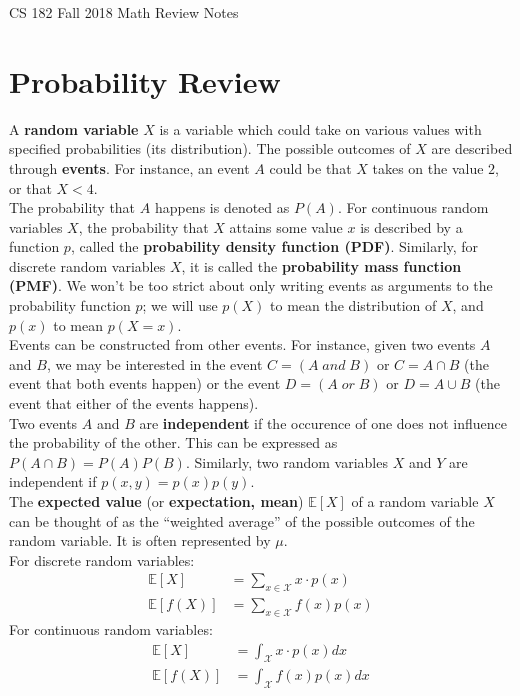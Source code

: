 \documentclass[12pt,letterpaper]{article}
\newcommand{\E}{\mathbb{E}}
\begin{document}
\begin{center}
\LARGE{CS 182 Fall 2018 Math Review Notes}
\end{center}

\section{Probability Review}

A {\bf{random variable}} $X$ is a variable which could take on various values with specified probabilities (its distribution). The possible outcomes of $X$ are described through {\bf{events}}. For instance, an event $A$ could be that $X$ takes on the value $2$, or that $X < 4$. \\

\noindent The probability that $A$ happens is denoted as $P(A)$. For continuous random variables $X$, the probability that $X$ attains some value $x$ is described by a function $p$, called the {\bf{probability density function (PDF)}}. Similarly, for discrete random variables $X$, it is called the {\bf{probability mass function (PMF)}}. We won't be too strict about only writing events as arguments to the probability function $p$; we will use $p(X)$ to mean the distribution of $X$, and $p(x)$ to mean $p(X = x)$. \\

\noindent Events can be constructed from other events. For instance, given two events $A$ and $B$, we may be interested in the event $C = (A \; and \; B)$ or $C = A \cap B$ (the event that both events happen) or the event $D = (A \; or \;  B)$ or $D = A \cup B$ (the event that either of the events happens). \\

\noindent Two events $A$ and $B$ are {\bf{independent}} if the occurence of one does not influence the probability of the other. This can be expressed as $P(A \cap B) = P(A) P(B)$. Similarly, two random variables $X$ and $Y$ are independent if $p(x, y) = p(x)p(y)$.\\

\noindent  The {\bf{expected value}} (or {\bf{expectation, mean}}) $\E[X]$  of a random variable $X$ can be thought of as the ``weighted average'' of the possible outcomes of the random variable. It is often represented by $\mu$. \\

\noindent For discrete random variables:
\begin{align*}
  \E[X] &= \sum_{x \in \mathcal{X}} x \cdot p(x) \\
  \E[f(X)] &= \sum_{x \in \mathcal{X}} f(x) p(x)
\end{align*}
For continuous random variables:
\begin{align*}
  \E[X] &= \int_{\mathcal{X}} x \cdot p(x) dx \\
  \E[f(X)] &= \int_{\mathcal{X}} f(x) p(x) dx
\end{align*}
\end{document}
